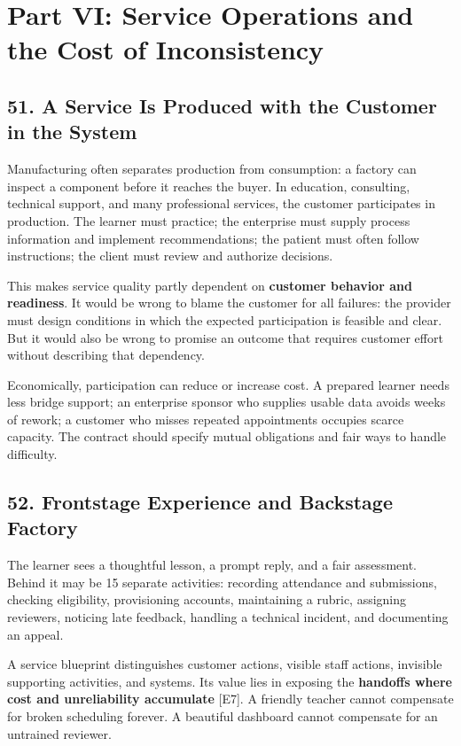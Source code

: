 \section*{Part VI: Service Operations and the Cost of Inconsistency}

\subsection*{51. A Service Is Produced with the Customer in the System}

Manufacturing often separates production from consumption: a factory can inspect a component before it reaches the buyer. In education, consulting, technical support, and many professional services, the customer participates in production. The learner must practice; the enterprise must supply process information and implement recommendations; the patient must often follow instructions; the client must review and authorize decisions.

This makes service quality partly dependent on \textbf{customer behavior and readiness}. It would be wrong to blame the customer for all failures: the provider must design conditions in which the expected participation is feasible and clear. But it would also be wrong to promise an outcome that requires customer effort without describing that dependency.

Economically, participation can reduce or increase cost. A prepared learner needs less bridge support; an enterprise sponsor who supplies usable data avoids weeks of rework; a customer who misses repeated appointments occupies scarce capacity. The contract should specify mutual obligations and fair ways to handle difficulty.

\subsection*{52. Frontstage Experience and Backstage Factory}

The learner sees a thoughtful lesson, a prompt reply, and a fair assessment. Behind it may be 15 separate activities: recording attendance and submissions, checking eligibility, provisioning accounts, maintaining a rubric, assigning reviewers, noticing late feedback, handling a technical incident, and documenting an appeal.

A service blueprint distinguishes customer actions, visible staff actions, invisible supporting activities, and systems. Its value lies in exposing the \textbf{handoffs where cost and unreliability accumulate} [E7]. A friendly teacher cannot compensate for broken scheduling forever. A beautiful dashboard cannot compensate for an untrained reviewer.

